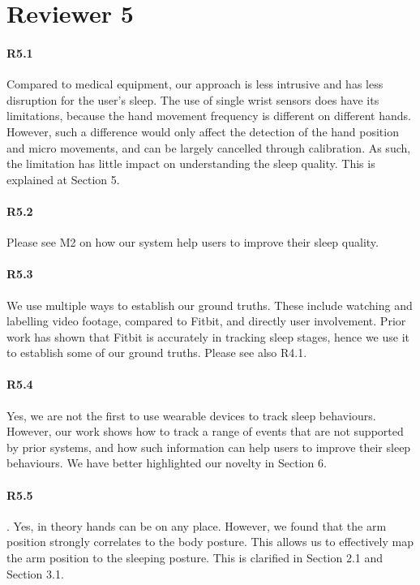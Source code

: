 \section*{Reviewer 5}

\paragraph{R5.1} Compared to medical equipment, our approach is less intrusive and has less disruption for the user's sleep. The use of
single wrist sensors does have its limitations, because the hand movement frequency is different on different hands. However, such a
difference would only affect the detection of the hand position and micro movements, and can be largely cancelled through calibration. As
such, the limitation has little impact on understanding the sleep quality. This is explained at Section 5.


\paragraph{R5.2} Please see M2 on how our system help users to improve their sleep quality.

\paragraph{R5.3} We use multiple ways to establish our ground truths. These include watching and labelling video footage, compared to
Fitbit, and directly user involvement. Prior work has shown that Fitbit is accurately in tracking sleep stages, hence we use it to
establish some of our ground truths. Please see also R4.1.

\paragraph{R5.4} Yes, we are not the first to use wearable devices to track sleep behaviours. However, our work shows how
 to track a range of events that are not supported by prior systems, and how such information can help users to improve
their sleep behaviours. We have better highlighted our novelty in Section 6.

\paragraph{R5.5}. Yes, in theory hands can be on any place. However, we found that the arm position strongly correlates to the body
posture. This allows us to effectively map the arm position to the sleeping posture. This is clarified in Section 2.1 and Section 3.1.

